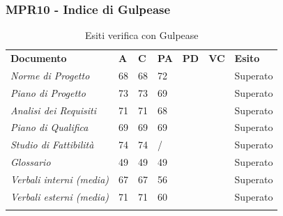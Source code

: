 \subsubsection{MPR10 - Indice di Gulpease}
\begin{center}
    \centering
    \renewcommand{\arraystretch}{1.8}
    \label{tab:IndiciGulpease}
    \begin{longtable}[!h]{p{100px} p{50px} p{50px} p{50px} p{50px} p{50px} p{50px}}
        \caption{Esiti verifica con Gulpease}                                                                                        \\
        \rowcolor{logo!70}   \textbf{Documento} & \textbf{A} & \textbf{C} & \textbf{PA} & \textbf{PD} & \textbf{VC} & \textbf{Esito} \\
        \textit{Norme di Progetto}              & 68         & 68         & 72          &             &             & Superato       \\
        \textit{Piano di Progetto}              & 73         & 73         & 69          &             &             & Superato       \\
        \textit{Analisi dei Requisiti}          & 71         & 71         & 68          &             &             & Superato       \\
        \textit{Piano di Qualifica}             & 69         & 69         & 69          &             &             & Superato       \\
        \textit{Studio di Fattibilità}          & 74         & 74         & /           &             &             & Superato       \\
        \textit{Glossario}                      & 49         & 49         & 49          &             &             & Superato       \\
        \textit{Verbali interni (media)}        & 67         & 67         & 56          &             &             & Superato       \\
        \textit{Verbali esterni (media)}        & 71         & 71         & 60          &             &             & Superato       \\
        \rowcolor{white}
    \end{longtable}
\end{center}
